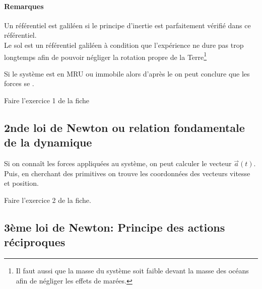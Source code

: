
\paragraph*{Remarques} 
Un référentiel est galiléen si le principe d'inertie est parfaitement vérifié dans ce référentiel.\\
Le sol est un référentiel galiléen à condition que l'expérience ne dure pas trop longtemps afin de pouvoir négliger la rotation propre de la Terre\footnote{ Il faut aussi que la masse du système soit faible devant la masse des océans afin de négliger les effets de marées. }

 Si le système est en MRU ou immobile alors d'après le  on peut conclure que  les forces se .
 
 
  Faire l'exercice 1 de la fiche

\subsection{2nde loi de Newton ou relation fondamentale de la dynamique}

 
 
 
 Si on connaît les forces appliquées au système, on peut calculer le vecteur $\vec{a}(t)$. Puis, en cherchant des primitives on trouve les coordonnées des vecteurs vitesse et position.
 \vspace{1cm}

\newpage
 
Faire l'exercice 2 de la fiche.\\

\subsection{3ème loi de Newton: Principe des actions réciproques}

